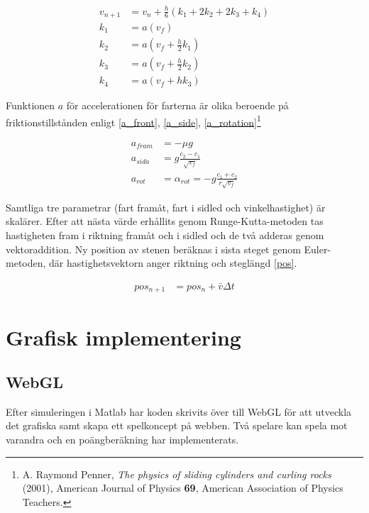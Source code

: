 \documentclass[11pt]{article} %
\begin{document}
 \begin{subequations}\label{impl}
 \begin{align}
 v_{n+1}& =v_n + \frac{h}{6} (k_1+2 k_2 + 2 k_3 + k_4)\\
 k_1& = a(v_f)\\
 k_2& = a(v_f + \frac{h}{2} k_1)\\
 k_3& = a(v_f + \frac{h}{2} k_2)\\
 k_4& = a(v_f + h k_3)
 \end{align}
\end{subequations}

Funktionen $a$ för accelerationen för farterna är olika beroende på friktionstillstånden enligt \eqref{a_front},  \eqref{a_side}, \eqref{a_rotation}\footnote{A. Raymond Penner, \emph{The physics of sliding cylinders and curling rocks} (2001), American Journal of Physics \textbf{69}, American Association of Physics Teachers.}
 
 \begin{align}\label{a_front}
 a_{fram}& = - \mu g\\\label{a_side}
 a_{sida}& = g \frac{c_2-c_1}{\sqrt{v_f}}\\\label{a_rotation}
 a_{rot}& = \alpha_{rot} = - g\frac{c_1+c_2}{r \sqrt{v_f}}
 \end{align}

Samtliga tre parametrar (fart framåt, fart i sidled och vinkelhastighet) är skalärer.
Efter att nästa värde erhållits genom Runge-Kutta-metoden tas hastigheten fram i riktning
framåt och i sidled och de två adderas genom vektoraddition. Ny position av stenen
beräknas i sista steget genom Euler-metoden, där hastighetsvektorn anger riktning och
steglängd \eqref{pos}. 

 \begin{align}\label{pos}
 pos_{n+1}& = pos_{n} + \bar{v} \Delta t
 \end{align}

\pagebreak

\section{Grafisk implementering}

\subsection{WebGL}
Efter simuleringen i Matlab har koden skrivits över till WebGL för att utveckla det grafiska samt skapa ett spelkoncept på webben. Två spelare kan spela mot varandra och en poängberäkning har implementerats. 
\end{document}
